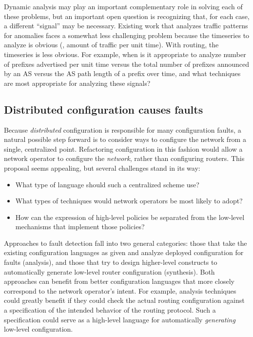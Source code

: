 Dynamic analysis may play an important complementary role in solving
each of these problems, but an important open question is recognizing
that, for each case, a different ``signal'' may be necessary.  Existing
work that analyzes traffic patterns for anomalies faces a somewhat less
challenging problem because the timeseries to analyze is obvious (\ie,
amount of traffic per unit time).  With routing, the timeseries is less
obvious.  For example, when is it appropriate to analyze number of
prefixes advertised per unit time versus the total number of prefixes
announced by an AS versus the AS path length of a prefix over time, and
what techniques are most appropriate for analyzing
these signals?

\subsection{Distributed configuration causes faults}

Because {\em distributed} configuration is responsible for many
configuration faults, a natural possible step forward is to consider
ways to configure the network from a single, centralized point.
Refactoring configuration in this fashion would allow a network operator
to configure the {\em network}, rather than configuring routers.  This
proposal seems appealing, but several challenges stand in its way:

\begin{itemize}
\itemsep=-1pt
\item What type of language should such a centralized scheme use?  
\item What types of techniques would network operators be most likely to
adopt?
\item How can the expression of high-level policies be separated from
the low-level mechanisms that implement those policies?
\end{itemize}


Approaches to fault detection fall into two general categories: those
that take the existing configuration languages as given and analyze
deployed configuration for faults (analysis), and those that try to
design higher-level constructs to automatically generate low-level
router configuration (synthesis).  Both approaches can benefit
from better configuration languages that more closely correspond to the
network operator's intent.  For example, analysis techniques could
greatly benefit if they could check the actual routing configuration
against a specification of the intended behavior of the routing
protocol.  Such a specification could serve as a high-level language for
automatically {\em generating} low-level configuration.

